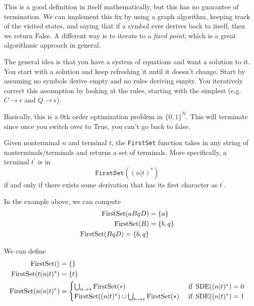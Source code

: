   This is a good definition in itself mathematically, but this has no guarantee of termination. We can implement this fix by using a graph algorithm, keeping track of the visited states, and saying that if a symbol ever derives back to itself, then we return False. A different way is to iterate to a \textit{fixed point}, which is a great algorithmic approach in general. 

  \begin{algo}
    The general idea is that you have a system of equations and want a solution to it. You start with a solution and keep refreshing it until it doesn't change. Start by assuming no symbols derive empty and no rules deriving empty. You iteratively correct this assumption by looking at the rules, starting with the simplest (e.g. $C \to \epsilon$ and $Q \to \epsilon$). 
  \end{algo}

  Basically, this is a 0th order optimization problem in $\{0, 1\}^N$. This will terminate since once you switch over to True, you can't go back to false. 

  \begin{definition}
    \label{def:first-set}
    Given nonterminal $n$ and terminal $t$, the \texttt{FirstSet} function takes in any string of nonterminals/terminals and returns a set of terminals. More specifically, a terminal $t^\prime$ is in 
    \begin{equation}
      \texttt{FirstSet}((n|t)^\ast)
    \end{equation}
    if and only if there exists some derivation that has its first character as $t^\prime$. 
  \end{definition}

  \begin{example}
    \label{ex:computing-first-sets}
    In the example above, we can compute 
    \begin{align}
      \operatorname*{FirstSet}(aBqD) & = \{a\} \\ 
      \operatorname*{FirstSet}(B) & = \{b, q\} \\ 
      \operatorname*{FirstSet}(BqD) = \{b, q\} 
    \end{align}
  \end{example}

  \begin{theorem}
    \label{thm:recursive-definition-of-firstset}
    We can define 
    \begin{align}
      \operatorname*{FirstSet}() & = \{\} \\ 
      \operatorname*{FirstSet}(t(n|t)^\ast) & = \{t\} \\ 
      \operatorname*{FirstSet}(n(n|t)^\ast) & = \begin{cases} 
        \bigcup_{n \to \ast} \operatorname*{FirstSet}(\ast) & \text{ if } \operatorname*{SDE}((n|t)^\ast) = 0 \\ 
        \operatorname*{FirstSet}((n|t)^\ast) \cup \bigcup_{n \to \ast} \operatorname*{FirstSet}(\ast) & \text{ if } \operatorname*{SDE}((n|t)^\ast) = 1
      \end{cases} 
    \end{align}
  \end{theorem}

